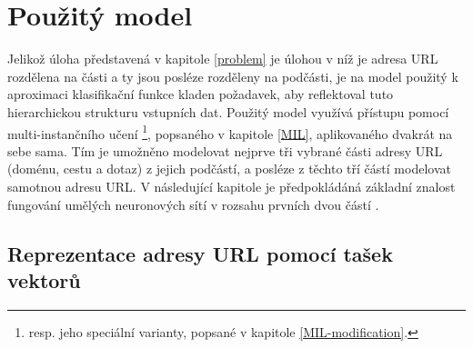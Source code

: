 \chapter{Použitý model}\label{model}

Jelikož úloha představená v kapitole \ref{problem} je úlohou v níž je adresa URL rozdělena na části a ty jsou posléze rozděleny na podčásti, je na model použitý k aproximaci klasifikační funkce kladen požadavek, aby reflektoval tuto hierarchickou strukturu vstupních dat. Použitý model využívá přístupu pomocí multi-instančního učení \footnote{resp. jeho speciální varianty, popsané v kapitole \ref{MIL-modification}.}, popsaného v kapitole \ref{MIL}, aplikovaného dvakrát na sebe sama. Tím je umožněno modelovat nejprve tři vybrané části adresy URL (doménu, cestu a dotaz) z jejich podčástí, a posléze z těchto tří částí modelovat samotnou adresu URL. V následující kapitole je předpokládáná základní znalost fungování umělých neuronových sítí v rozsahu prvních dvou částí \cite{goodfellow_deep_2016}.

\section{Reprezentace adresy URL pomocí tašek vektorů}\label{URL_MIL_representation}

